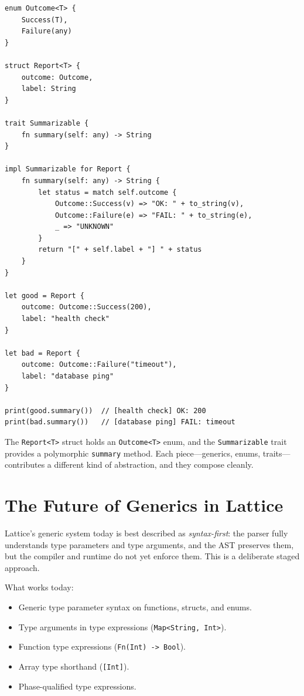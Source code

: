 \begin{lstlisting}[language=Lattice, caption={Combining generics with enums and traits}]
enum Outcome<T> {
    Success(T),
    Failure(any)
}

struct Report<T> {
    outcome: Outcome,
    label: String
}

trait Summarizable {
    fn summary(self: any) -> String
}

impl Summarizable for Report {
    fn summary(self: any) -> String {
        let status = match self.outcome {
            Outcome::Success(v) => "OK: " + to_string(v),
            Outcome::Failure(e) => "FAIL: " + to_string(e),
            _ => "UNKNOWN"
        }
        return "[" + self.label + "] " + status
    }
}

let good = Report {
    outcome: Outcome::Success(200),
    label: "health check"
}

let bad = Report {
    outcome: Outcome::Failure("timeout"),
    label: "database ping"
}

print(good.summary())  // [health check] OK: 200
print(bad.summary())   // [database ping] FAIL: timeout
\end{lstlisting}

The \lstinline|Report<T>| struct holds an \lstinline|Outcome<T>| enum, and
the \lstinline|Summarizable| trait provides a polymorphic \lstinline|summary|
method. Each piece---generics, enums, traits---contributes a different kind
of abstraction, and they compose cleanly.

\section{The Future of Generics in Lattice}\label{sec:generics-future}

Lattice's generic system today is best described as \emph{syntax-first}:
the parser fully understands type parameters and type arguments, and the
AST preserves them, but the compiler and runtime do not yet enforce them.
This is a deliberate staged approach.

What works today:
\begin{itemize}
  \item Generic type parameter syntax on functions, structs, and enums.
  \item Type arguments in type expressions (\lstinline|Map<String, Int>|).
  \item Function type expressions (\lstinline|Fn(Int) -> Bool|).
  \item Array type shorthand (\lstinline|[Int]|).
  \item Phase-qualified type expressions.
\end{itemize}

